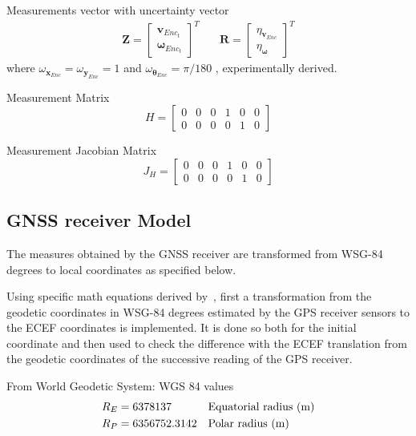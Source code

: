 Measurements vector with uncertainty vector
\begin{align}
\mathbf{Z}
=
\begin{bmatrix}
\mathbf{v}_{Enc_t} \\
\boldsymbol \omega_{Enc_t}
\end{bmatrix}^T
& \quad
\mathbf{R}
=
\begin{bmatrix}
\eta_{\mathbf{v}_{Enc}} \\
\eta_{\boldsymbol \omega}
\end{bmatrix}^T
\end{align}
where $ \omega_{\mathbf{x}_{Enc}} = \omega_{\mathbf{y}_{Enc}} = 1$ and
$ \omega_{\boldsymbol \theta_{Enc}} = \pi/180 $ , experimentally derived.


Measurement Matrix
\begin{equation}
H
=
\begin{bmatrix}
0 & 0 & 0 & 1 & 0 & 0 \\
0 & 0 & 0 & 0 & 1 & 0
\end{bmatrix}
\end{equation}

Measurement Jacobian Matrix
\begin{equation}
J_H
=
\begin{bmatrix}
0 & 0 & 0 & 1 & 0 & 0 \\
0 & 0 & 0 & 0 & 1 & 0
\end{bmatrix}
\end{equation}


\subsection{GNSS receiver Model}

\noindent The measures obtained by the \gls{GNSS} receiver are transformed from WSG-84 degrees to local coordinates as specified below.

Using specific math equations derived by~\cite{Vincenty}, first a transformation from the geodetic coordinates in WSG-84 degrees estimated by the GPS receiver sensors to the ECEF coordinates is implemented.
It is done so both for the initial coordinate and then used to check the difference with the ECEF translation from the geodetic coordinates of the successive reading of the GPS receiver.



From World Geodetic System: WGS 84 values
\begin{align}
    R_E &= 6378137 && \text{Equatorial radius (\SI{}{\meter})} \\
    R_P &= 6356752.3142 && \text{Polar radius (\SI{}{\meter})}
\end{align}


